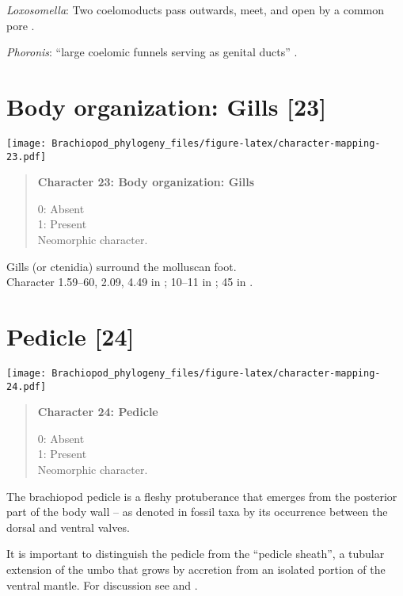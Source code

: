 \documentclass[openany]{book}
\theoremstyle{definition}
\theoremstyle{definition}
\theoremstyle{definition}
\theoremstyle{remark}
\begin{document}
\hypertarget{Loxosomella-coding-22}{}
\emph{Loxosomella}: Two coelomoducts pass outwards, meet, and open by a
common pore \citep{Goodrich1945}.

\hypertarget{Phoronis-coding-22}{}
\emph{Phoronis}: ``large coelomic funnels serving as genital ducts''
\citep{Goodrich1945}.

\section{Body organization: Gills
{[}23{]}}\label{body-organization-gills-23}

\texttt{[image: Brachiopod\_phylogeny\_files/figure-latex/character-mapping-23.pdf]}

\begin{quote}
\textbf{Character 23: Body organization: Gills}

0: Absent\\
1: Present\\
Neomorphic character.
\end{quote}

Gills (or ctenidia) surround the molluscan foot.\\
Character 1.59--60, 2.09, 4.49 in \citet{SPS1996}; 10--11 in
\citet{Haszprunar2000}; 45 in \citet{Sutton2012}.

\section{Pedicle {[}24{]}}\label{pedicle-24}

\texttt{[image: Brachiopod\_phylogeny\_files/figure-latex/character-mapping-24.pdf]}

\begin{quote}
\textbf{Character 24: Pedicle}

0: Absent\\
1: Present\\
Neomorphic character.
\end{quote}

The brachiopod pedicle is a fleshy protuberance that emerges from the
posterior part of the body wall -- as denoted in fossil taxa by its
occurrence between the dorsal and ventral valves.

It is important to distinguish the pedicle from the ``pedicle sheath'',
a tubular extension of the umbo that grows by accretion from an isolated
portion of the ventral mantle. For discussion see
\citet{Holmer2018Theattachment} and \citet{Bassett2017Earliestontogeny}.
\end{document}
